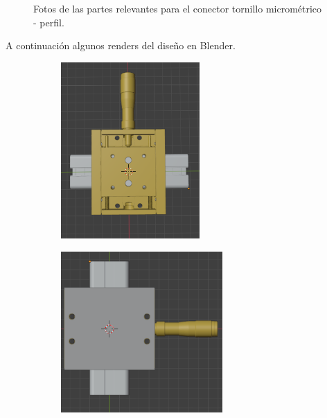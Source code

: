 \begin{figure}[!ht]
\begin{minipage}[c]{0.249\textwidth}
\begin{subfigure}{\textwidth}
				\captionsetup{width=0.8\textwidth}
			\end{subfigure}
		\end{minipage}
	\caption{Fotos de las partes relevantes para el conector tornillo micrométrico - perfil.} %
	\label{fig:}
\end{figure}


A continuación algunos renders del diseño en Blender.

\begin{figure}[!ht]
	\begin{minipage}[c]{0.5\textwidth}
			\begin{subfigure}{\textwidth}
					\centering
					\includegraphics[width=0.58\textwidth]{Figures/21_04_2025/Vista_frontal_tornillo_perfil}
					\captionsetup{width=0.8\textwidth}
				\end{subfigure}
		\end{minipage}\begin{minipage}[c]{0.49\textwidth}
			\begin{subfigure}{\textwidth}
					\centering
					\includegraphics[width=0.6778\textwidth]{Figures/21_04_2025/Vista_trasera_tornillo_perfil}
					\captionsetup{width=0.8\textwidth}
				\end{subfigure}
		\end{minipage}


\end{figure}
